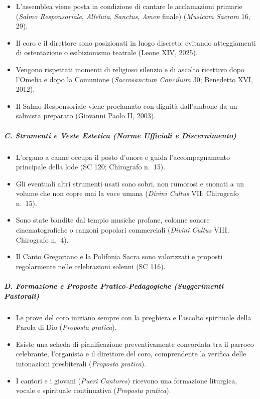 \documentclass[12pt,a4paper]{article}
\begin{document}
	\begin{itemize}[leftmargin=*,label=$\square$]
		\item L'assemblea viene posta in condizione di cantare le acclamazioni primarie (\emph{Salmo Responsoriale}, \emph{Alleluia}, \emph{Sanctus}, \emph{Amen} finale) (\emph{Musicam Sacram} 16, 29).
		\item Il coro e il direttore sono posizionati in luogo discreto, evitando atteggiamenti di ostentazione o esibizionismo teatrale (Leone XIV, 2025).
		\item Vengono rispettati momenti di religioso silenzio e di ascolto ricettivo dopo l'Omelia e dopo la Comunione (\emph{Sacrosanctum Concilium} 30; Benedetto XVI, 2012).
		\item Il Salmo Responsoriale viene proclamato con dignità dall'ambone da un salmista preparato (Giovanni Paolo II, 2003).
	\end{itemize}
	
	\subparagraph{C. Strumenti e Veste Estetica (Norme Ufficiali e Discernimento)}\label{c-strumenti-e-veste-estetica}
	
	\begin{itemize}[leftmargin=*,label=$\square$]
		\item L'organo a canne occupa il posto d'onore e guida l'accompagnamento principale della lode (SC 120; Chirografo n.~15).
		\item Gli eventuali altri strumenti usati sono sobri, non rumorosi e suonati a un volume che non copre mai la voce umana (\emph{Divini Cultus} VII; Chirografo n.~15).
		\item Sono state bandite dal tempio musiche profane, colonne sonore cinematografiche o canzoni popolari commerciali (\emph{Divini Cultus} VIII; Chirografo n.~4).
		\item Il Canto Gregoriano e la Polifonia Sacra sono valorizzati e proposti regolarmente nelle celebrazioni solenni (SC 116).
	\end{itemize}
	
	\subparagraph{D. Formazione e Proposte Pratico-Pedagogiche (Suggerimenti Pastorali)}\label{d-formazione-e-proposte-pratico-pedagogiche}
	
	\begin{itemize}[leftmargin=*,label=$\square$]
		\item Le prove del coro iniziano sempre con la preghiera e l'ascolto spirituale della Parola di Dio (\emph{Proposta pratica}).
		\item Esiste una scheda di pianificazione preventivamente concordata tra il parroco celebrante, l'organista e il direttore del coro, comprendente la verifica delle intonazioni presbiterali (\emph{Proposta pratica}).
		\item I cantori e i giovani (\emph{Pueri Cantores}) ricevono una formazione liturgica, vocale e spirituale continuativa (\emph{Proposta pratica}).
	\end{itemize}
	
\end{document}
